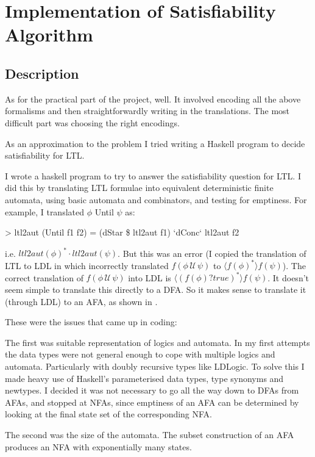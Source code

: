 
\section {Implementation of Satisfiability Algorithm}
\subsection{Description}

As for the practical part of the project, well.
It involved encoding all the above formalisms
and then straightforwardly writing in the translations.
The most difficult part was choosing the right encodings.

As an approximation to the problem I tried writing a Haskell program to decide satisfiability for LTL.

I wrote a haskell program to try to answer the satisfiability question for LTL.
I did this by translating LTL formulae into equivalent deterministic finite automata, using basic automata and combinators, and testing for emptiness. For example, I translated $\phi$ Until $\psi$ as:
\begin{code}
> ltl2aut (Until f1 f2) = (dStar \$ ltl2aut f1) `dConc` ltl2aut f2
\end{code}
i.e. $ ltl2aut(\phi)^* \cdot ltl2aut(\psi) $.
But this was an error (I copied the translation of LTL to LDL in \cite{ldlf} which incorrectly translated $ f(\phi \, \mathcal{U} \, \psi) $ to $\langle f(\phi)^* \rangle f(\psi)$).
The correct translation of $ f(\phi \, \mathcal{U} \, \psi) $ into LDL is $\langle (f(\phi)?true)^* \rangle f(\psi)$. It doesn't seem simple to translate this directly to a DFA. So it makes sense to translate it (through LDL) to an AFA, as shown in \cite{ldlf}.

These were the issues that came up in coding:

The first was suitable representation of logics and automata.
In my first attempts the data types were not general enough
to cope with multiple logics and automata.
Particularly with doubly recursive types like LDLogic.
To solve this I made heavy use of Haskell's parameterised data types,
type synonyms and newtypes.
I decided it was not necessary to go all the way down to DFAs from
AFAs, and stopped at NFAs, since
emptiness of an AFA can be determined by looking at
the final state set of the corresponding NFA.

The second was the size of the automata.
The subset construction of an AFA produces an
NFA with exponentially many states.

